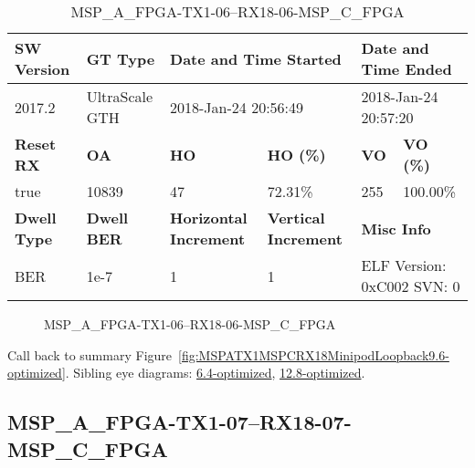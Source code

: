 \begin{table}[h]
\centering
\caption{MSP\_A\_FPGA-TX1-06--RX18-06-MSP\_C\_FPGA}
\label{tab:MSPAFPGATX106RX1806MSPCFPGA9.6-optimized}
\begin{tabular}{@{}|l|l|l|l|l|l|@{}}
\toprule
\textbf{SW Version}                & \textbf{GT Type}   & \multicolumn{2}{l|}{\textbf{Date and Time Started}}            & \multicolumn{2}{l|}{\textbf{Date and Time Ended}}        \\ \midrule
2017.2                       & UltraScale GTH          & \multicolumn{2}{l|}{2018-Jan-24 20:56:49}                   & \multicolumn{2}{l|}{2018-Jan-24 20:57:20}               \\ \midrule
\textbf{Reset RX}                  & \textbf{OA} & \textbf{HO}   & \textbf{HO (\%)} & \textbf{VO} & \textbf{VO (\%)} \\ \midrule
true & 10839        & 47          & 72.31\%        & 255        & 100.00\%       \\ \midrule
\textbf{Dwell Type}                & \textbf{Dwell BER} & \textbf{Horizontal Increment} & \textbf{Vertical Increment}    & \multicolumn{2}{l|}{\textbf{Misc Info}}                  \\ \midrule
BER                            & 1e-7        & 1        & 1           & \multicolumn{2}{l|}{ELF Version: 0xC002 SVN: 0}                         \\ \bottomrule
\end{tabular}
\end{table}

\begin{figure}[h]
\caption{MSP\_A\_FPGA-TX1-06--RX18-06-MSP\_C\_FPGA} \label{fig:MSPAFPGATX106RX1806MSPCFPGA9.6-optimized}
\end{figure}

Call back to summary Figure~\ref{fig:MSPATX1MSPCRX18MinipodLoopback9.6-optimized}.
Sibling eye diagrams: \hyperref[sec:MSPAFPGATX106RX1806MSPCFPGA6.4-optimized]{6.4-optimized}, \hyperref[sec:MSPAFPGATX106RX1806MSPCFPGA12.8-optimized]{12.8-optimized}.

\clearpage
\newpage


\subsection{MSP\_A\_FPGA-TX1-07--RX18-07-MSP\_C\_FPGA}\label{sec:MSPAFPGATX107RX1807MSPCFPGA9.6-optimized}

